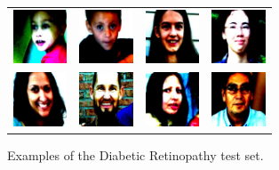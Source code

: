 \documentclass[journal]{IEEEtran}
\begin{document}
\begin{itemize}
		\begin{figure}[!t]
			\centering
			\begin{tabular}{cccc}
				\includegraphics[width=1.6cm]{img/adience/1.jpg} & \includegraphics[width=1.6cm]{img/adience/2.jpg} & \includegraphics[width=1.6cm]{img/adience/3.jpg} & \includegraphics[width=1.6cm]{img/adience/4.jpg}\\
				\includegraphics[width=1.6cm]{img/adience/5.jpg} & \includegraphics[width=1.6cm]{img/adience/6.jpg} & \includegraphics[width=1.6cm]{img/adience/7.jpg} & \includegraphics[width=1.6cm]{img/adience/8.jpg}
			\end{tabular}						
			\caption{Examples of the Diabetic Retinopathy test set.}
			\label{fig:AdienceExamples}
		\end{figure}
	\end{itemize}
	
\end{document}
